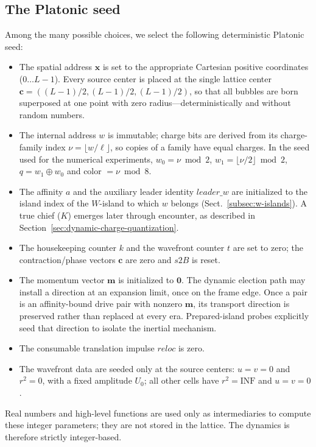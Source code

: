 \documentclass[a4paper]{article}
\begin{document}
\subsection{The Platonic seed}
Among the many possible choices, we select the following deterministic Platonic seed:
\begin{itemize}
\item The spatial address $\boldsymbol{x}$ is set to the appropriate Cartesian positive coordinates ($0\ldots L-1$).  Every source center is placed at the single lattice center $\mathbf{c}=((L-1)/2,(L-1)/2,(L-1)/2)$, so that all bubbles are born superposed at one point with zero radius---deterministically and without random numbers.
\item The internal address $w$ is immutable; charge bits are derived from its charge-family index $\nu=\lfloor w/\ell\rfloor$, so copies of a family have equal charges. In the seed used for the numerical experiments, $w_0=\nu\bmod2$, $w_1=\lfloor\nu/2\rfloor\bmod2$, $q=w_1\oplus w_0$ and color $=\nu\bmod8$.
\item The affinity $a$ and the auxiliary leader identity $\mathit{leader\_w}$ are initialized to the island index of the $W$-island to which $w$ belongs (Sect.~\ref{subsec:w-islands}).  A true chief ($K$) emerges later through encounter, as described in Section~\ref{sec:dynamic-charge-quantization}.
\item The housekeeping counter $k$ and the wavefront counter $t$ are set to zero; the contraction/phase vectors $\mathbf{c}$ are zero and $s2B$ is reset.
\item The momentum vector $\boldsymbol{m}$ is initialized to $\boldsymbol{0}$. The dynamic election path may install a direction at an expansion limit, once on the frame edge. Once a pair is an affinity-bound drive pair with nonzero $\boldsymbol{m}$, its transport direction is preserved rather than replaced at every era. Prepared-island probes explicitly seed that direction to isolate the inertial mechanism.
\item The consumable translation impulse $\mathit{reloc}$ is zero.
\item The wavefront data are seeded only at the source centers: $u=v=0$ and $r^{2}=0$, with a fixed amplitude $U_{0}$; all other cells have $r^{2}=\mathrm{INF}$ and $u=v=0$.
\end{itemize}
Real numbers and high-level functions are used only as intermediaries to compute these integer parameters; they are not stored in the lattice.  The dynamics is therefore strictly integer-based.
\end{document}
